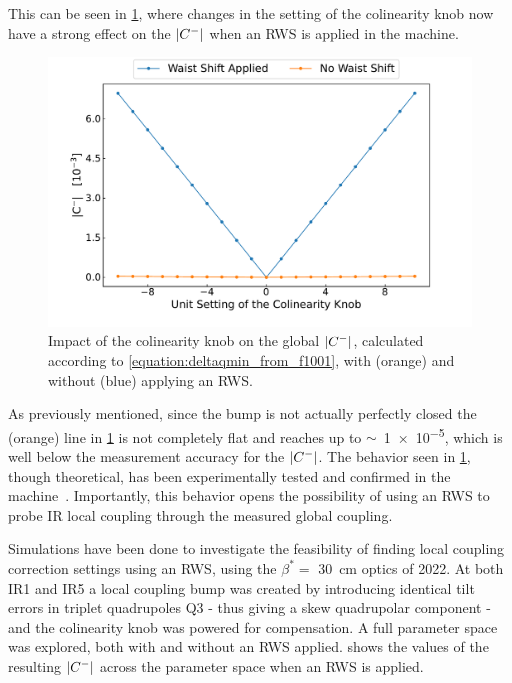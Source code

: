 This can be seen in \cref{figure:knob_to_cminus_with_waist}, where changes in the setting of the colinearity knob now have a strong effect on the \(\left\lvert C^{-} \right\rvert\) when an RWS is applied in the machine.

\begin{figure}[!htb]
    \centering
    \includegraphics*[width=0.99\columnwidth]{Figures/IR_Coupling_Correction/colin_knob_vs_waist_shift.pdf}
    \caption{Impact of the colinearity knob on the global \(\left\lvert C^{-} \right\rvert\), calculated according to \cref{equation:deltaqmin_from_f1001}, with (\textcolor{mplorange}{orange}) and without (\textcolor{mplblue}{blue}) applying an RWS.}
    \label{figure:knob_to_cminus_with_waist}
\end{figure}

As previously mentioned, since the bump is not actually perfectly closed the (\textcolor{mplorange}{orange}) line in \cref{figure:knob_to_cminus_with_waist} is not completely flat and reaches up to \(\sim\)~\num{1e-5}, which is well below the measurement accuracy for the \(\left\lvert C^{-} \right\rvert\).
The behavior seen in \cref{figure:knob_to_cminus_with_waist}, though theoretical, has been experimentally tested and confirmed in the machine~\cite{CERN:Persson:Local_Coupling_IP}.
Importantly, this behavior opens the possibility of using an RWS to probe IR local coupling through the measured global coupling.
\newline

Simulations have been done to investigate the feasibility of finding local coupling correction settings using an RWS, using the \(\beta^{\ast} = \) \qty{30}{cm} optics of \num{2022}.
At both IR\num{1} and IR\num{5} a local coupling bump was created by introducing identical tilt errors in triplet quadrupoles Q\num{3} - thus giving a skew quadrupolar component - and the colinearity knob was powered for compensation.
A full parameter space was explored, both with and without an RWS applied.
 shows the values of the resulting \(\left\lvert C^{-} \right\rvert\) across the parameter space when an RWS is applied.

